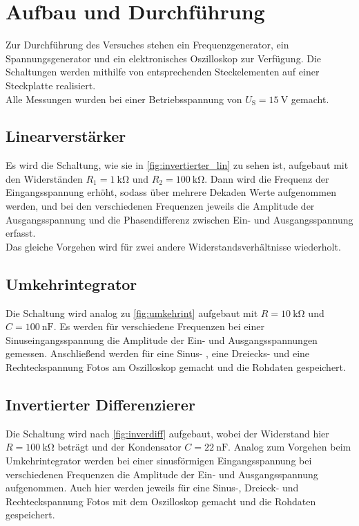 \newpage
\section{Aufbau und Durchführung}

    \noindent 
    Zur Durchführung des Versuches stehen ein Frequenzgenerator, ein Spannungsgenerator und ein elektronisches Oszilloskop zur Verfügung. 
    Die Schaltungen werden mithilfe von entsprechenden Steckelementen auf einer Steckplatte realisiert. \\ 
    Alle Messungen wurden bei einer Betriebsspannung von $U_\text{S} = \SI{15}{\volt}$ gemacht.

    \subsection{Linearverstärker}

        \noindent 
        Es wird die Schaltung, wie sie in \autoref{fig:invertierter_lin} zu sehen ist, aufgebaut mit den Widerständen $R_1 = \SI{1}{\kilo\ohm}$ und 
        $R_2 = \SI{100}{\kilo\ohm}$. Dann wird die Frequenz der Eingangsspannung erhöht, sodass über mehrere Dekaden Werte aufgenommen werden, und bei 
        den verschiedenen Frequenzen jeweils die Amplitude der Ausgangsspannung und die Phasendifferenz zwischen Ein- und Ausgangsspannung erfasst. \\
        Das gleiche Vorgehen wird für zwei andere Widerstandsverhältnisse wiederholt. 

    \subsection{Umkehrintegrator}

        \noindent 
        Die Schaltung wird analog zu \autoref{fig:umkehrint} aufgebaut mit $R = \SI{10}{\kilo\ohm}$ und $C = \SI{100}{\nano\farad}$. 
        Es werden für verschiedene Frequenzen bei einer Sinuseingangsspannung die Amplitude der Ein- und Ausgangsspannungen gemessen. 
        Anschließend werden für eine Sinus- , eine Dreiecks- und eine Rechteckspannung Fotos am Oszilloskop gemacht und die Rohdaten gespeichert.

    \subsection{Invertierter Differenzierer}

        \noindent
        Die Schaltung wird nach \autoref{fig:inverdiff} aufgebaut, wobei der Widerstand hier $R= \SI{100}{\kilo\ohm}$ beträgt und der Kondensator 
        $C = \SI{22}{\nano\farad}$. Analog zum Vorgehen beim Umkehrintegrator werden bei einer sinusförmigen Eingangsspannung bei verschiedenen 
        Frequenzen die Amplitude der Ein- und Ausgangsspannung aufgenommen. Auch hier werden jeweils für eine Sinus-, Dreieck- und Rechteckspannung 
        Fotos mit dem Oszilloskop gemacht und die Rohdaten gespeichert.

